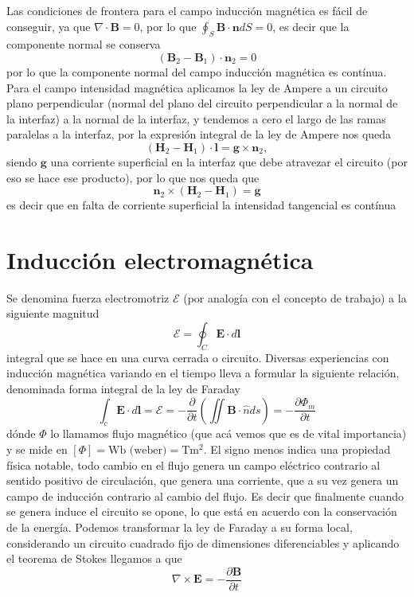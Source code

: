 \documentclass[11pt,a4paper]{article}
\numberwithin{equation}{section}
\begin{document}
Las condiciones de frontera para el campo inducción magnética es fácil de conseguir, ya que $\nabla \cdot \textbf{B} = 0$, por lo que $\oint_{S} \textbf{B} \cdot \textbf{n} dS = 0$, es decir que la componente normal se conserva
\begin{equation}
    (\textbf{B}_2 - \textbf{B}_1)\cdot \textbf{n}_2 = 0
    \label{eq:m_induccion_interfaz}
\end{equation}
por lo que la componente normal del campo inducción magnética es contínua. Para el campo intensidad magnética aplicamos la ley de Ampere a un circuito plano perpendicular (normal del plano del circuito perpendicular a la normal de la interfaz) a la normal de la interfaz, y tendemos a cero el largo de las ramas paralelas a la interfaz, por la expresión integral de la ley de Ampere nos queda \[(\textbf{H}_2 - \textbf{H}_1)\cdot \textbf{l} = \textbf{g} \times \textbf{n}_2,\] siendo $\textbf{g}$ una corriente superficial en la interfaz que debe atravezar el circuito (por eso se hace ese producto), por lo que nos queda que
\begin{equation}
    \textbf{n}_2 \times (\textbf{H}_2 - \textbf{H}_1) = \textbf{g}
    \label{eq:m_intensidad_interfaz}
\end{equation}
es decir que en falta de corriente superficial la intensidad tangencial es contínua

\section{Inducción electromagnética}
Se denomina fuerza electromotriz $\mathcal{E}$ (por analogía con el concepto de trabajo) a la siguiente magnitud
\begin{equation}
    \mathcal{E} = \oint_{C} \textbf{E} \cdot d\textbf{l}
    \label{eq:im_fem}
\end{equation}
integral que se hace en una curva cerrada o circuito. Diversas experiencias con inducción magnética variando en el tiempo lleva a formular la siguiente relación, denominada forma integral de la ley de Faraday
\begin{equation}
    \int_c \textbf{E} \cdot d\textbf{l} = \mathcal{E} = -
    \frac{\partial}{\partial t} \left(\iint \textbf{B} \cdot \hat{n} ds \right) = -
    \frac{\partial \Phi_m}{\partial t}
    \label{eq:im_faraday_int}
\end{equation}
dónde $\Phi$ lo llamamos flujo magnético (que acá vemos que es de vital importancia) y se mide en $[\Phi] = \text{Wb (weber)} = \text{T}\text{m}^{2}$. El signo menos indica una propiedad física notable, todo cambio en el flujo genera un campo eléctrico contrario al sentido positivo de circulación, que genera una corriente, que a su vez genera un campo de inducción contrario al cambio del flujo. Es decir que finalmente cuando se genera induce el circuito se opone, lo que está en acuerdo con la conservación de la energía. Podemos transformar la ley de Faraday a su forma local, considerando un circuito cuadrado fijo de dimensiones diferenciables y aplicando el teorema de Stokes llegamos a que
\begin{equation}
    \nabla \times \textbf{E} = - \frac{\partial \textbf{B}}{\partial t}
    \label{eq:im_faraday_dif}
\end{equation}
\end{document}
